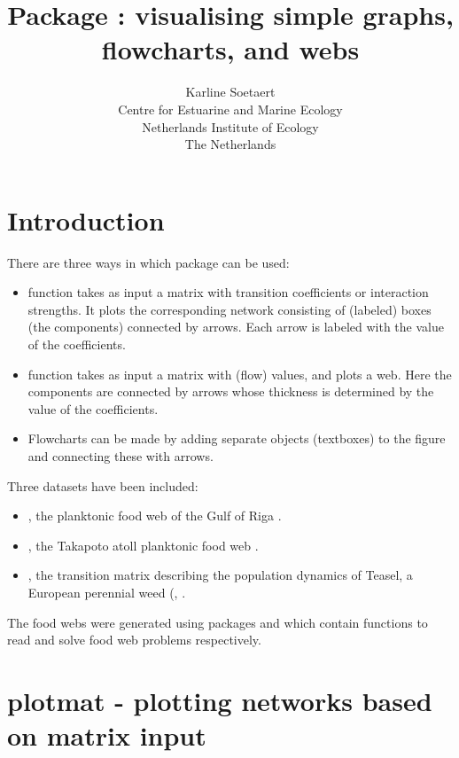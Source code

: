 \documentclass[article,nojss]{jss}
\title{\proglang{R} Package \pkg{diagram}: visualising simple graphs,
flowcharts, and webs}
\author{Karline Soetaert\\
Centre for Estuarine and Marine Ecology\\
Netherlands Institute of Ecology\\
The Netherlands
}
\begin{document}
\maketitle

\section{Introduction}

There are three ways in which package  can be used:

\begin{itemize}
\item function  takes as input a matrix with transition coefficients
or interaction strengths. It plots the corresponding network consisting of
(labeled) boxes (the components) connected by arrows. Each arrow is labeled with the value
of the coefficients.

\item function  takes as input a matrix with (flow) values, and plots a
web. Here the components are connected by arrows whose thickness is determined by the
value of the coefficients.

\item Flowcharts can be made by adding separate objects (textboxes) to the figure and connecting these with arrows.
\end{itemize}

Three datasets have been included:
\begin{itemize}
\item {}, the planktonic food web of the Gulf of Riga \citep{Donali99}.
\item {}, the Takapoto atoll planktonic food web \citep{Niquil98}.
\item {}, the transition matrix describing the population dynamics of Teasel, a European perennial weed (\citep{Caswell01}, \citep{Soetaert08}.
\end{itemize}

The food webs were generated using  packages  and
 \citep{Soetaert08b, Soetaert08c} which contain functions to read and
solve food web problems respectively.

\section{plotmat - plotting networks based on matrix input}
\end{document}
